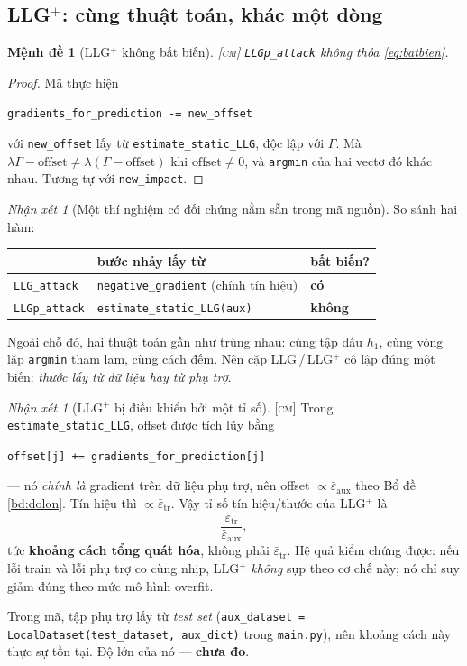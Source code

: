 \documentclass[11pt,a4paper]{article}
\newtheorem{menhde}[dinhly]{Mệnh đề}
\theoremstyle{remark}
\newtheorem{nhanxet}[dinhly]{Nhận xét}
\newcommand{\epstr}{\bar\varepsilon_{\mathrm{tr}}}
\newcommand{\epsaux}{\bar\varepsilon_{\mathrm{aux}}}
\newcommand{\code}[1]{\texttt{\small #1}}
\begin{document}
\subsection{LLG\texorpdfstring{$^+$}{+}: cùng thuật toán, khác một dòng}
\label{sec:llgp}

\begin{menhde}[LLG$^+$ không bất biến]
\label{md:llgp}
\textsc{[cm]}\; \code{LLGp\_attack} không thỏa \eqref{eq:batbien}.
\end{menhde}

\begin{proof}
Mã thực hiện
\begin{center}
\code{gradients\_for\_prediction -= new\_offset}
\end{center}
với \code{new\_offset} lấy từ \code{estimate\_static\_LLG}, độc lập với
$\Gamma$. Mà $\lambda\Gamma-\text{offset}\ne\lambda(\Gamma-\text{offset})$ khi
$\text{offset}\ne0$, và \code{argmin} của hai vectơ đó khác nhau. Tương tự với
\code{new\_impact}.
\end{proof}

\begin{nhanxet}[Một thí nghiệm có đối chứng nằm sẵn trong mã nguồn]
\label{nx:doichung}
So sánh hai hàm:
\begin{center}
\begin{tabular}{@{}lll@{}}
\toprule
& \textbf{bước nhảy lấy từ} & \textbf{bất biến?} \\
\midrule
\code{LLG\_attack}  & \code{negative\_gradient} (chính tín hiệu) & \textbf{có} \\
\code{LLGp\_attack} & \code{estimate\_static\_LLG(aux)}          & \textbf{không} \\
\bottomrule
\end{tabular}
\end{center}
Ngoài chỗ đó, hai thuật toán gần như trùng nhau: cùng tập dấu $h_1$, cùng vòng
lặp \code{argmin} tham lam, cùng cách đếm. Nên cặp LLG\,/\,LLG$^+$ cô lập
đúng một biến: \emph{thước lấy từ dữ liệu hay từ phụ trợ}.
\end{nhanxet}

\begin{nhanxet}[LLG$^+$ bị điều khiển bởi một tỉ số]
\label{nx:llgpratio}
\textsc{[cm]}\; Trong \code{estimate\_static\_LLG}, offset được tích lũy bằng
\begin{center}
\code{offset[j] += gradients\_for\_prediction[j]}
\end{center}
--- nó \emph{chính là}
gradient trên dữ liệu phụ trợ, nên offset $\propto\epsaux$ theo Bổ đề
\ref{bd:dolon}. Tín hiệu thì $\propto\epstr$. Vậy tỉ số tín hiệu/thước của
LLG$^+$ là
\[
\frac{\epstr}{\epsaux},
\]
tức \textbf{khoảng cách tổng quát hóa}, không phải $\epstr$. Hệ quả kiểm
chứng được: nếu lỗi train và lỗi phụ trợ co cùng nhịp, LLG$^+$ \emph{không}
sụp theo cơ chế này; nó chỉ suy giảm đúng theo mức mô hình overfit.

Trong mã, tập phụ trợ lấy từ \emph{test set}
(\code{aux\_dataset = LocalDataset(test\_dataset, aux\_dict)} trong
\code{main.py}), nên khoảng cách này thực sự tồn tại. Độ lớn của nó ---
\textbf{chưa đo}.
\end{nhanxet}
\end{document}
